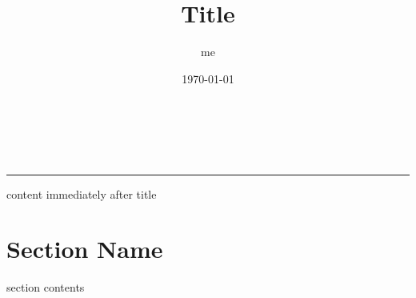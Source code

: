 \documentclass[paper=A4,pagesize,DIV=calc,fontsize=14pt]{scrartcl}
\renewcommand{\maketitle}{%
            \ifx\documentCase\documentCaseKOMA
            \hphantom{.} \\
            \vspace{-1.6\baselineskip} \\
            \begin{minipage}{\textwidth}
                \begin{titlepage}
                    \begin{flushleft}
                        \LARGE\thetitle
                    \end{flushleft}
                    \begin{flushleft}
                        \large\scshape\hphantom{M}\theauthor
                    \end{flushleft}
                    \begin{flushleft}
                        \large\scshape\hphantom{M}\thedate
                    \end{flushleft}
                \end{titlepage}
            \end{minipage}
            \noindent\rule{\textwidth}{1pt}
            \vspace{\baselineskip}
            \fi%
        }
\begin{document}
\title{Title}
\author{me}
\date{\today}
\maketitle
content immediately after title
\section{Section Name}
section contents
\end{document}
